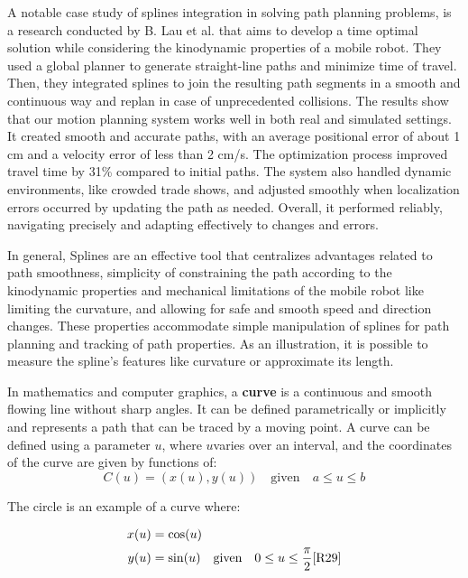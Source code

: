A notable case study of splines integration in solving path planning problems, is a research conducted 
by B. Lau et al. \cite{R30} that aims to develop a time optimal solution while considering the kinodynamic 
properties of a mobile robot. They used a global planner to generate straight-line paths and minimize time 
of travel. Then, they  integrated splines to join the resulting path segments in a smooth and continuous 
way and replan in case of unprecedented collisions. The results show that our motion planning system works 
well in both real and simulated settings. It created smooth and accurate paths, with an average positional 
error of about 1 cm and a velocity error of less than 2 cm/s. The optimization process improved travel 
time by 31\% compared to initial paths. The system also handled dynamic environments, like crowded trade 
shows, and adjusted smoothly when localization errors occurred by updating the path as needed. Overall, 
it performed reliably, navigating precisely and adapting effectively to changes and errors.

In general, Splines are an effective tool that centralizes advantages related to path smoothness,
simplicity of constraining the path according to the kinodynamic properties and mechanical
limitations of the mobile robot like limiting the curvature, and allowing for safe and smooth
speed and direction changes. These properties accommodate simple manipulation of splines for
path planning and tracking of path properties. As an illustration, it is possible to measure the
spline’s features like curvature or approximate its length.


In mathematics and computer graphics, a \textbf{curve} is a continuous and smooth flowing line without sharp angles. 
It can be defined parametrically or implicitly and represents a path that can be traced by a moving point.
A curve can be defined using a parameter 
\(u\), where \(u\)varies over an interval, and the coordinates of the curve are given by functions of:
\begin{equation}
    C(u) = (x(u), y(u)) \quad \text{given} \quad a \leq u \leq b \label{eq:curve}
\end{equation}

The circle is an example of a curve where:

\hspace*{-1cm} %
\begin{align}
    x(u) &= \cos(u) \\
    y(u) &= \sin(u) \quad \text{given} \quad 0 \leq u \leq \frac{\pi}{2}     \cite{R29}
\end{align}

